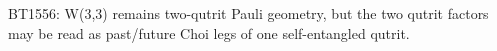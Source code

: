 \begin{center}\small
BT1556: W(3,3) remains two-qutrit Pauli geometry, but the two qutrit factors may be read as past/future Choi legs of one self-entangled qutrit.
\end{center}
